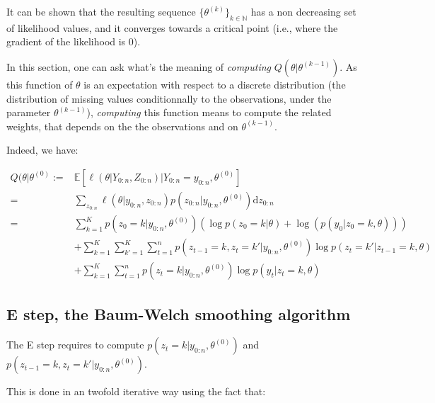 \documentclass[]{book}
\begin{document}
It can be shown that the resulting sequence
\(\lbrace\theta^{(k)} \rbrace_{k \in \mathbb{N}}\) has a non decreasing
set of likelihood values, and it converges towards a critical point
(i.e., where the gradient of the likelihood is 0).

In this section, one can ask what's the meaning of \emph{computing}
\(Q(\theta \vert \theta^{(k-1)})\). As this function of \(\theta\) is an
expectation with respect to a discrete distribution (the distribution of
missing values conditionnally to the observations, under the parameter
\(\theta^{(k-1)}\)), \emph{computing} this function means to compute the
related weights, that depends on the the observations and on
\(\theta^{(k-1)}\).

Indeed, we have:

\begin{align}
Q(\theta \vert \theta^{(0)} :=& \mathbb{E}[\ell(\theta \vert Y_{0:n}, Z_{0:n}) \vert Y_{0:n} = y_{0:n}, \theta^{(0)}]\nonumber \\
=& \sum_{z_{0:n}} \ell(\theta \vert y_{0:n}, z_{0:n}) p(z_{0:n} \vert y_{0:n}, \theta^{(0)}) \text{d} z_{0:n} \nonumber \\
=& \sum_{k = 1}^K p(z_0 = k \vert y_{0:n}, \theta^{(0)})\left(\log p(z_0 = k \vert \theta) + \log(p(y_0 \vert z_0 = k, \theta))\right)  \nonumber \\
& + \sum_{k = 1}^K\sum_{k' = 1}^K \sum_{t = 1}^n p(z_{t-1} = k, z_{t} = k'\vert y_{0:n}, \theta^{(0)}) \log p(z_{t} = k' \vert z_{t - 1} = k,\theta) \nonumber \\
& + \sum_{k = 1}^K \sum_{t = 1}^n p(z_t = k\vert y_{0:n}, \theta^{(0)}) \log p(y_{t} \vert z_{t} = k, \theta) \nonumber
\end{align}

\subsection{E step, the Baum-Welch smoothing
algorithm}\label{e-step-the-baum-welch-smoothing-algorithm}

The E step requires to compute
\(p(z_t = k \vert y_{0:n}, \theta^{(0)})\) and
\(p(z_{t - 1} = k, z_{t} = k' \vert y_{0:n}, \theta^{(0)})\).

This is done in an twofold iterative way using the fact that:
\end{document}
